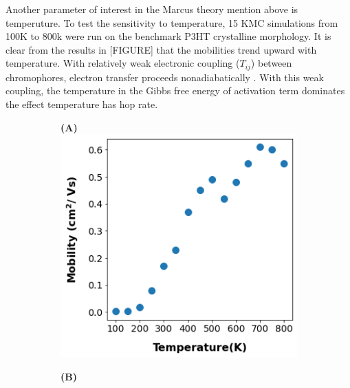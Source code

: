 Another parameter of interest in the Marcus theory mention above is temperuture. To test the sensitivity to
temperature, 15 KMC simulations from 100K to 800k were run on the benchmark P3HT crystalline morphology. It
is clear from the results in [FIGURE] that the mobilities trend upward with temperature. With relatively
weak electronic coupling ($T_{ij}$) between chromophores, electron transfer proceeds nonadiabatically
\cite{clarke2010}. With this weak coupling, the temperature in the Gibbs free energy of activation term
dominates the effect temperature has hop rate. 

\begin{figure}[]
\centering
\begin{subfigure}{.5\textwidth}
    \textbf{(A)}
    \centering
    \includegraphics[width=\textwidth]{figures/temp.png}
    \newline
\end{subfigure}%
\begin{subfigure}{.5\textwidth}
    \textbf{(B)}
    \centering

\end{subfigure}
\end{figure}
